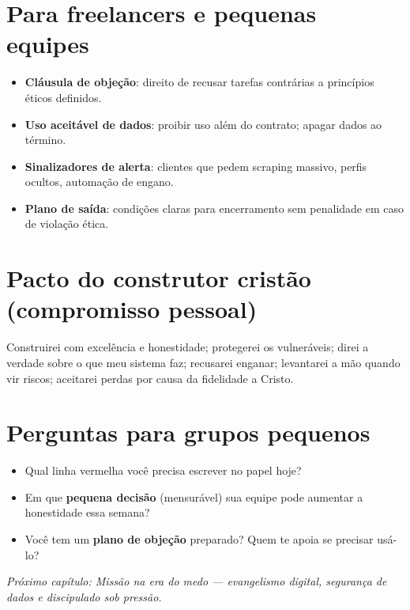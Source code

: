 \section{Para freelancers e pequenas equipes}
\begin{checklist}[title={Cláusulas e práticas que te protegem}]
\begin{itemize}[leftmargin=*,noitemsep]
  \item \textbf{Cláusula de objeção}: direito de recusar tarefas contrárias a princípios éticos definidos.
  \item \textbf{Uso aceitável de dados}: proibir uso além do contrato; apagar dados ao término.
  \item \textbf{Sinalizadores de alerta}: clientes que pedem scraping massivo, perfis ocultos, automação de engano.
  \item \textbf{Plano de saída}: condições claras para encerramento sem penalidade em caso de violação ética.
\end{itemize}
\end{checklist}

\section{Pacto do construtor cristão (compromisso pessoal)}
\begin{tcolorbox}[title=Compromisso]
Construirei com excelência e honestidade; protegerei os vulneráveis; direi a verdade sobre o que meu sistema faz; recusarei enganar; levantarei a mão quando vir riscos; aceitarei perdas por causa da fidelidade a Cristo.
\end{tcolorbox}

\section{Perguntas para grupos pequenos}
\begin{itemize}[leftmargin=*,noitemsep]
  \item Qual linha vermelha você precisa escrever no papel hoje?
  \item Em que \textbf{pequena decisão} (mensurável) sua equipe pode aumentar a honestidade essa semana?
  \item Você tem um \textbf{plano de objeção} preparado? Quem te apoia se precisar usá-lo?
\end{itemize}

\bigskip
\noindent\textit{Próximo capítulo: Missão na era do medo — evangelismo digital, segurança de dados e discipulado sob pressão.}
